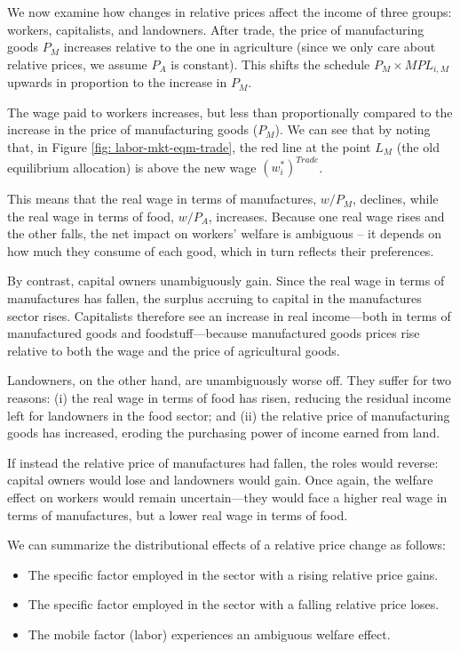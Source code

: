 \documentclass[11pt,letterpaper]{article}
\begin{document}
{We now examine how changes in relative prices affect the income of three groups: workers, capitalists, and landowners. After trade, the price of manufacturing goods $P_M$ increases relative to the one in agriculture (since we only care about relative prices, we assume $P_A$ is constant). This shifts the schedule $P_M \times MPL_{i,M}$ upwards in proportion to the increase in $P_M$.

The wage paid to workers increases, but less than proportionally compared to the increase in the price of manufacturing goods ($P_M$). We can see that by noting that, in Figure \eqref{fig: labor-mkt-eqm-trade}, the red line at the point $L_M$ (the old equilibrium allocation) is above the new wage $(w_{i}^*)^{Trade}$.

This means that the real wage in terms of manufactures, $w/P_M$, declines, while the real wage in terms of food, $w/P_A$, increases. Because one real wage rises and the other falls, the net impact on workers' welfare is ambiguous -- it depends on how much they consume of each good, which in turn reflects their preferences. 

By contrast, capital owners unambiguously gain. Since the real wage in terms of manufactures has fallen, the surplus accruing to capital in the manufactures sector rises. Capitalists therefore see an increase in real income—both in terms of manufactured goods and foodstuff—because manufactured goods prices rise relative to both the wage and the price of agricultural goods.

Landowners, on the other hand, are unambiguously worse off. They suffer for two reasons: (i) the real wage in terms of food has risen, reducing the residual income left for landowners in the food sector; and (ii) the relative price of manufacturing goods has increased, eroding the purchasing power of income earned from land.

If instead the relative price of manufactures had fallen, the roles would reverse: capital owners would lose and landowners would gain. Once again, the welfare effect on workers would remain uncertain—they would face a higher real wage in terms of manufactures, but a lower real wage in terms of food.

\medskip
\noindent
We can summarize the distributional effects of a relative price change as follows:
\begin{itemize}
    \item The specific factor employed in the sector with a rising relative price gains.
    \item The specific factor employed in the sector with a falling relative price loses.
    \item The mobile factor (labor) experiences an ambiguous welfare effect.
\end{itemize}


}
\end{document}

